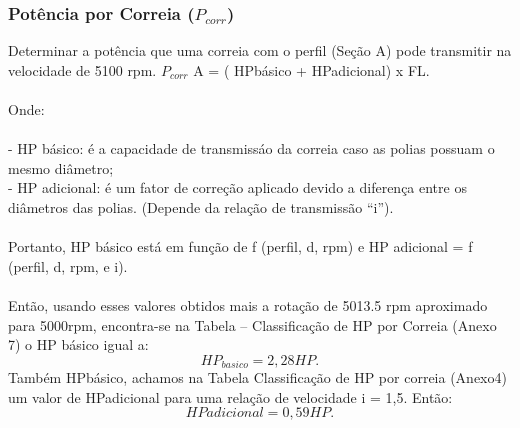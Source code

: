 \documentclass[a4paper, 11pt]{article}
\begin{document}
\subsubsection{Pot\^encia por Correia ($P_{corr}$)}
Determinar a pot\^encia que uma correia com o perfil (Se\c{c}\~ao A) pode
transmitir na velocidade de 5100 rpm.
$P_{corr}$ A = ( HPb\'asico + HPadicional) x FL.\\\\
Onde:\\\\
- HP b\'asico: \'e a capacidade de transmiss\'ao da correia caso as polias possuam o mesmo di\^ametro;\\
- HP adicional: \'e um fator de corre\c{c}\~ao aplicado devido a diferen\c{c}a entre os
di\^ametros das polias. (Depende da rela\c{c}\~ao de transmiss\~ao “i”).\\\\
Portanto, HP b\'asico est\'a em fun\c{c}\~ao de f (perfil, d, rpm) e HP adicional = f (perfil,
d, rpm, e i).\\\\
Ent\~ao, usando esses valores obtidos mais a rota\c{c}\~ao de 5013.5 rpm aproximado para 5000rpm, encontra-se na Tabela – Classificação de HP por Correia (Anexo 7) o HP b\'asico igual a:\\
$$HP_{basico} = 2,28 HP.$$
Tamb\'em HPb\'asico, achamos na Tabela Classifica\c{c}\~ao de HP por correia
(Anexo4) um valor de HPadicional para uma relação de velocidade i = 1,5. Ent\~ao:\\
$$HPadicional = 0,59 HP.$$
\end{document}

